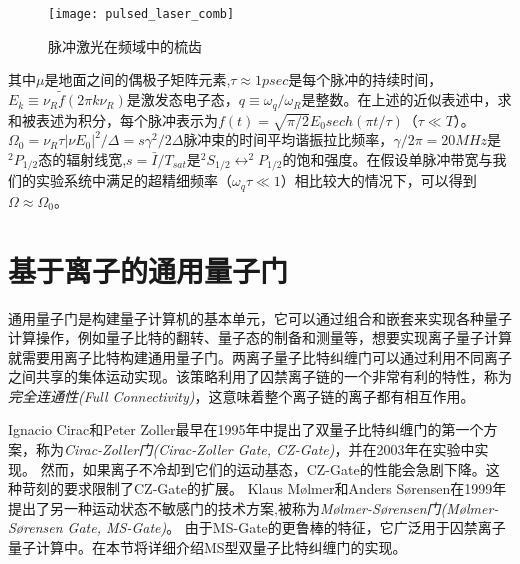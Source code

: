 \begin{figure}
    \centering
    \caption[脉冲激光在频域中的梳齿]{脉冲激光在频域中的梳齿\cite[Chap1.3]{Mizrahi_2013}\label{fig:pulsed_laser_comb}}
    \texttt{[image: pulsed\_laser\_comb]}
\end{figure}

其中$\mu$是地面之间的偶极子矩阵元素,$\tau\approx 1 psec$是每个脉冲的持续时间，$E_k\equiv \nu_R\tilde{f}(2\pi k\nu_R)$是激发态电子态，$q\equiv\omega_q/\omega_R$是整数。在上述的近似表述中，求和被表述为积分，每个脉冲表示为$f(t)=\sqrt{\pi/2}E_0 sech(\pi t/\tau)$（$\tau\ll T$）。$\Omega_0=\nu_R\tau|\nu E_0|^2/\Delta=s\gamma^2/2\Delta$脉冲束的时间平均谐振拉比频率，$\gamma/2\pi=20MHz$是$^2P_{1/2}$态的辐射线宽,$s=\bar{I}/T_{sat}$是$^2S_{1/2}\leftrightarrow ^2P_{1/2}$的饱和强度。在假设单脉冲带宽与我们的实验系统中满足的超精细频率（$\omega_q\tau\ll 1$）相比较大的情况下，可以得到$\Omega\approx\Omega_0$。








\section[基于离子的通用量子门]{基于离子的通用量子门}

通用量子门是构建量子计算机的基本单元，它可以通过组合和嵌套来实现各种量子计算操作，例如量子比特的翻转、量子态的制备和测量等，想要实现离子量子计算就需要用离子比特构建通用量子门。两离子量子比特纠缠门可以通过利用不同离子之间共享的集体运动实现。该策略利用了囚禁离子链的一个非常有利的特性，称为\emph{完全连通性(Full Connectivity)}，这意味着整个离子链的离子都有相互作用。

Ignacio Cirac和Peter Zoller最早在1995年中提出了双量子比特纠缠门的第一个方案\cite[]{Cirac_Zoller_2002}，称为\emph{Cirac-Zoller门(Cirac-Zoller Gate, CZ-Gate)}，并在2003年在实验中实现\cite[]{Schmidt_Kaler_Häffner_Riebe_Gulde_Lancaster_Deuschle_Becher_Roos_Eschner_Blatt_2003}。
然而，如果离子不冷却到它们的运动基态，CZ-Gate的性能会急剧下降。这种苛刻的要求限制了CZ-Gate的扩展。
Klaus Mølmer和Anders Sørensen在1999年提出了另一种运动状态不敏感门的技术方案\cite[]{Sørensen_Mølmer_2002},被称为\emph{Mølmer-Sørensen门(Mølmer-Sørensen Gate, MS-Gate)}。
由于MS-Gate的更鲁棒的特征，它广泛用于囚禁离子量子计算中。在本节将详细介绍MS型双量子比特纠缠门的实现。

